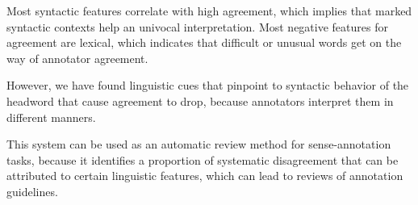 \documentclass[11pt,a4paper]{article}
\begin{document}
Most syntactic features correlate with high agreement, which implies that marked syntactic contexts help an univocal interpretation. Most negative features for agreement are lexical, which indicates that difficult or unusual words get on the way of annotator agreement.

However, we have found linguistic cues that pinpoint to syntactic behavior of the headword that cause agreement to drop, because annotators interpret them in different manners. 


This system can be used as an automatic review method for sense-annotation tasks, because it identifies a proportion of systematic disagreement that can be attributed to certain linguistic features, which can lead to reviews of annotation guidelines. 





\end{document}
